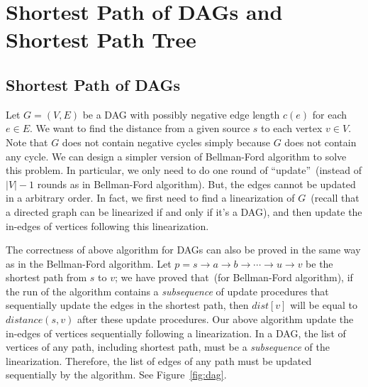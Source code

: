 \setcounter{definition}{0} \setcounter{property}{0} \setcounter{claim}{0} \setcounter{fact}{0} \setcounter{corollary}{0} \setcounter{figure}{0}
\section{Shortest Path of DAGs and Shortest Path Tree}

\subsection*{Shortest Path of DAGs}
Let $G = (V, E)$ be a DAG with possibly negative edge length $c(e)$ for each $e\in E$.
We want to find the distance from a given source $s$ to each vertex $v\in V$.
Note that $G$ does not contain negative cycles simply because $G$ does not contain any cycle.
We can design a simpler version of Bellman-Ford algorithm to solve this problem.
In particular, we only need to do one round of ``update''~(instead of $|V|-1$ rounds as in Bellman-Ford algorithm).
But, the edges cannot be updated in a arbitrary order. In fact,
we first need to find a linearization of $G$~(recall that a directed graph can be linearized if and only if it's a DAG),
and then update the in-edges of vertices following this linearization.


\begin{minipage}{0.8\textwidth}
	\xxx
	\xxx
	\xxx
	\xxx
	\xxx
	\xxx
	\xxx
	\xxx
	\xxx
	\xxx
\end{minipage}


The correctness of above algorithm for DAGs can also be proved in the same way as in the Bellman-Ford algorithm.
Let $p = s \to a \to b \to \cdots \to u \to v$ be the shortest path from $s$ to $v$;
we have proved that~(for Bellman-Ford algorithm), if the run of the algorithm contains a \emph{subsequence} of update procedures
that sequentially update the edges in the shortest path, then 
$dist[v]$ will be equal to $distance(s,v)$ after these update procedures.
Our above algorithm update the in-edges of vertices sequentially following a linearization.
In a DAG, the list of vertices of any path, including shortest path, must be a \emph{subsequence}
of the linearization. Therefore, the list of edges of any path must be updated
sequentially by the algorithm. See Figure~\ref{fig:dag}.

